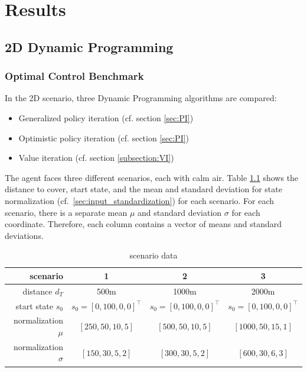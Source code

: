 \chapter{Results}
\label{chapter6}

\section{2D Dynamic Programming}

\subsection{Optimal Control Benchmark}
\label{sec:results2d}
In the 2D scenario, three Dynamic Programming algorithms are compared:

\begin{itemize}
	\item Generalized policy iteration (cf. section \ref{sec:PI})
	\item Optimistic policy iteration (cf. section \ref{sec:PI})
	\item Value iteration (cf. section \ref{subsection:VI})
\end{itemize}

The agent faces three different scenarios, each with calm air. Table \ref{tab:scenario_data} shows the distance to cover, start state, and the mean and standard deviation for state normalization (cf.~\ref{sec:input_standardization}) for each scenario. For each scenario, there is a separate mean $\mu$ and standard deviation $\sigma$ for each coordinate. Therefore, each column contains a vector of means and standard deviations.

\begin{table}[h]
	\begin{center}
		\begin{tabular}{r|c c c}
			scenario & 1 & 2 & 3 \\ \hline
			distance $d_T$ & 500m & 1000m & 2000m\\
			start state $s_0$ & $s_0 = [0, 100, 0, 0]^\top$ &  $s_0 = [0, 100, 0, 0]^\top$  &  $s_0 = [0, 100, 0, 0]^\top$  \\
			normalization $\mu$ & $[250, 50, 10, 5]$  & $[500, 50, 10, 5]$ & $[1000, 50, 15, 1]$ \\
			normalization $\sigma$ & $[150, 30, 5, 2]$ & $[300, 30, 5, 2]$ & $[600, 30, 6, 3]$
		\end{tabular}
		\caption{scenario data}
		\label{tab:scenario_data}
	\end{center}
\end{table}

